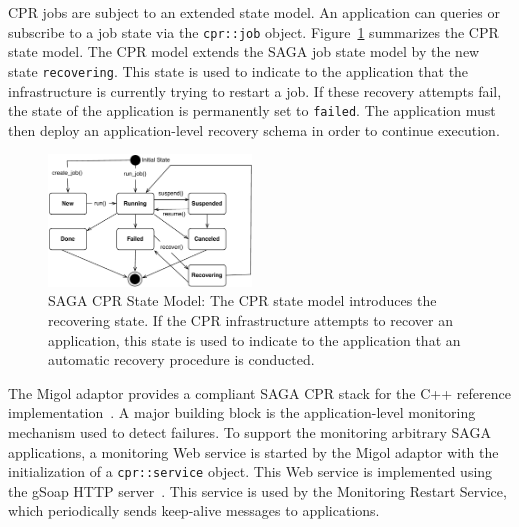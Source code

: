 \documentclass[times, 10pt,twocolumn]{article}
\begin{document}
CPR jobs are subject to an extended state model. An application can queries or subscribe to a job state via the \texttt{cpr::job} object.      
Figure~\ref{fig:cpr-statemodel} summarizes the CPR state model. The CPR model extends the SAGA job state model by the new state \texttt{recovering}. This state
is used to indicate to the application that the infrastructure is currently trying to restart a job. 
If these recovery attempts fail, the state of the application is permanently set to \texttt{failed}. 
The application must then deploy an application-level recovery schema in order to continue execution. 

\begin{figure}[th]
    \centering
        \includegraphics[width=0.48\textwidth]{cpr-statemodel.pdf}
    \caption{SAGA CPR State Model: The CPR state model introduces the recovering state. If the CPR infrastructure attempts to recover an application, this state is used to indicate to the application that an automatic recovery procedure is conducted.}
    \label{fig:cpr-statemodel}
\end{figure}
 

The Migol adaptor provides a compliant SAGA CPR stack for the C++ reference implementation~\cite{Kaiser:2006qp}. 
A major building block is the application-level monitoring mechanism used to detect failures. 
To support the monitoring arbitrary SAGA applications, a monitoring Web service is started 
by the Migol adaptor with the initialization of a \texttt{cpr::service} object. This Web 
service is implemented using the gSoap HTTP server~\cite{gsoap}.  This service is used by the Monitoring Restart Service,
which periodically sends keep-alive messages to applications.                                                                             

\end{document}
